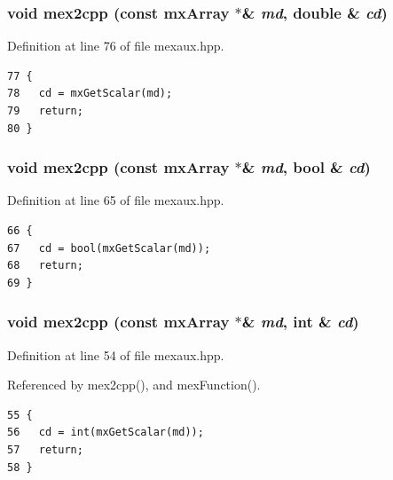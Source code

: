 \subsubsection{\setlength{\rightskip}{0pt plus 5cm}void mex2cpp (const mx\-Array $\ast$\& {\em md}, double \& {\em cd})\hspace{0.3cm}{\tt  [inline]}}\label{mexaux_8hpp_0d3e4024d8e4092ae58d2c5ca71aa6d2_0d3e4024d8e4092ae58d2c5ca71aa6d2}




Definition at line 76 of file mexaux.hpp.

\footnotesize\begin{verbatim}77 {
78   cd = mxGetScalar(md);
79   return;
80 }
\end{verbatim}\normalsize 


\subsubsection{\setlength{\rightskip}{0pt plus 5cm}void mex2cpp (const mx\-Array $\ast$\& {\em md}, bool \& {\em cd})\hspace{0.3cm}{\tt  [inline]}}\label{mexaux_8hpp_5d90d7017d6e60ef81600533e4f2c455_5d90d7017d6e60ef81600533e4f2c455}




Definition at line 65 of file mexaux.hpp.

\footnotesize\begin{verbatim}66 {
67   cd = bool(mxGetScalar(md));
68   return;
69 }
\end{verbatim}\normalsize 


\subsubsection{\setlength{\rightskip}{0pt plus 5cm}void mex2cpp (const mx\-Array $\ast$\& {\em md}, int \& {\em cd})\hspace{0.3cm}{\tt  [inline]}}\label{mexaux_8hpp_4815783b10341fc2161565e465710b27_4815783b10341fc2161565e465710b27}




Definition at line 54 of file mexaux.hpp.

Referenced by mex2cpp(), and mex\-Function().

\footnotesize\begin{verbatim}55 {
56   cd = int(mxGetScalar(md));
57   return;
58 }
\end{verbatim}\normalsize 


